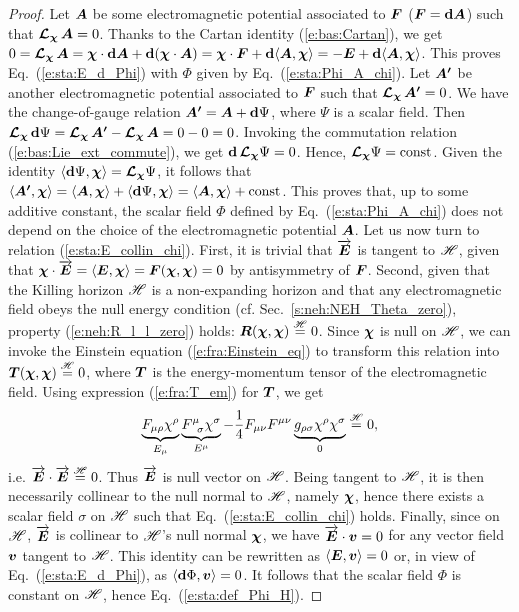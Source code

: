 \begin{proof}
Let $\bm{A}$ be some electromagnetic potential associated to $\bm{F}$ ($\bm{F} = \mathbf{d} \bm{A}$)
such that $\bm{\mathcal{L}}_{\bm{\chi}}\, \bm{A} = 0$.
Thanks to the Cartan identity (\ref{e:bas:Cartan}), we get
$0 = \bm{\mathcal{L}}_{\bm{\chi}}\, \bm{A} = \bm{\chi}\cdot\mathbf{d}\bm{A}
    + \mathbf{d}(\bm{\chi}\cdot\bm{A}) = \bm{\chi}\cdot\bm{F} + \mathbf{d} \langle \bm{A}, \bm{\chi} \rangle
    = -\bm{E} + \mathbf{d} \langle \bm{A}, \bm{\chi} \rangle $. This proves Eq.~(\ref{e:sta:E_d_Phi})
with $\Phi$ given by Eq.~(\ref{e:sta:Phi_A_chi}).
Let $\bm{A'}$ be another electromagnetic potential associated to $\bm{F}$
such that $\bm{\mathcal{L}}_{\bm{\chi}}\, \bm{A'} = 0$. We have the change-of-gauge relation
$\bm{A'} = \bm{A} + \mathbf{d}\Psi$, where $\Psi$ is a scalar field.
Then $\bm{\mathcal{L}}_{\bm{\chi}}\, \mathbf{d}\Psi = \bm{\mathcal{L}}_{\bm{\chi}}\, \bm{A'}  - \bm{\mathcal{L}}_{\bm{\chi}}\, \bm{A} = 0 - 0 = 0$.
Invoking the commutation relation (\ref{e:bas:Lie_ext_commute}), we get
$\mathbf{d} \, \bm{\mathcal{L}}_{\bm{\chi}}\,\! \Psi = 0$. Hence, $\bm{\mathcal{L}}_{\bm{\chi}}\,\! \Psi = \mathrm{const}$.
Given the identity $\langle \mathbf{d} \Psi, \bm{\chi} \rangle = \bm{\mathcal{L}}_{\bm{\chi}}\,\! \Psi$,
it follows that $\langle \bm{A'}, \bm{\chi} \rangle = \langle \bm{A}, \bm{\chi} \rangle
+ \langle \mathbf{d} \Psi, \bm{\chi} \rangle = \langle \bm{A}, \bm{\chi} \rangle  + \mathrm{const}$.
This proves that, up to some additive constant, the scalar field $\Phi$ defined by Eq.~(\ref{e:sta:Phi_A_chi}) does not depend on the choice of the electromagnetic potential
$\bm{A}$. Let us now turn to relation (\ref{e:sta:E_collin_chi}). First, it is trivial
that $\overrightarrow{\bm{E}}$ is tangent to $\mathscr{H}$, given that $\bm{\chi}\cdot\overrightarrow{\bm{E}} = \langle \bm{E},\bm{\chi} \rangle = \bm{F}(\bm{\chi}, \bm{\chi}) = 0$ by antisymmetry of $\bm{F}$.
Second, given that the Killing horizon $\mathscr{H}$ is a non-expanding horizon and that
any electromagnetic field obeys the null energy condition
(cf. Sec.~\ref{s:neh:NEH_Theta_zero}), property (\ref{e:neh:R_l_l_zero})
holds: $\bm{R}(\bm{\chi},\bm{\chi}) \stackrel{\mathscr{H}}{=} 0$. Since $\bm{\chi}$ is null on $\mathscr{H}$,
we can invoke the Einstein equation (\ref{e:fra:Einstein_eq}) to
transform this relation into $\bm{T}(\bm{\chi},\bm{\chi}) \stackrel{\mathscr{H}}{=} 0$, where
$\bm{T}$ is the energy-momentum tensor of the electromagnetic field.
Using expression (\ref{e:fra:T_em}) for $\bm{T}$, we get
\[
    \underbrace{F_{\mu\rho} \chi^\rho}_{E_\mu}
    \underbrace{F^\mu_{\ \, \sigma} \chi^\sigma}_{E^\mu}
    - \frac{1}{4}  F_{\mu\nu} F^{\mu\nu}
    \underbrace{g_{\rho\sigma} \chi^\rho \chi^\sigma}_{0} \stackrel{\mathscr{H}}{=} 0 ,
\]
i.e. $\overrightarrow{\bm{E}}\cdot\overrightarrow{\bm{E}} \stackrel{\mathscr{H}}{=} 0$. Thus $\overrightarrow{\bm{E}}$ is null vector on $\mathscr{H}$.
Being tangent to $\mathscr{H}$, it is then necessarily collinear to the null normal
to $\mathscr{H}$, namely $\bm{\chi}$, hence there exists a scalar field $\sigma$ on $\mathscr{H}$
such that Eq.~(\ref{e:sta:E_collin_chi}) holds.
Finally, since on $\mathscr{H}$, $\overrightarrow{\bm{E}}$ is collinear to $\mathscr{H}$'s null normal $\bm{\chi}$,
we have $\overrightarrow{\bm{E}}\cdot\bm{v} = 0$ for any vector field $\bm{v}$ tangent to $\mathscr{H}$.
This identity can be rewritten as $\langle \bm{E}, \bm{v} \rangle = 0$ or,
in view of Eq.~(\ref{e:sta:E_d_Phi}), as $\langle \mathbf{d}\Phi,  \bm{v} \rangle = 0$.
It follows that the scalar field $\Phi$ is constant on $\mathscr{H}$, hence Eq.~(\ref{e:sta:def_Phi_H}).
\end{proof}

